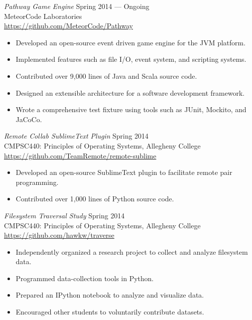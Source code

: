 \documentclass[margin]{res}
\begin{document}
\begin{resume}
        {\sl Pathway Game Engine} \hfill Spring 2014 --- Ongoing \\
                MeteorCode Laboratories \\ 
        \url{https://github.com/MeteorCode/Pathway}
        \begin{itemize} \itemsep -2pt %
        \item Developed an open-source event driven game engine for the JVM platform.
        \item Implemented features such as file I/O, event system, and scripting systems.
        \item Contributed over 9,000 lines of Java and Scala source code.
        \item Designed an extensible architecture for a software development framework.
        \item Wrote a comprehensive test fixture using tools such as JUnit, Mockito, and JaCoCo.
        \end{itemize}
        
        {\sl Remote Collab SublimeText Plugin } \hfill Spring 2014 \\
        CMPSC440: Principles of Operating Systems, Allegheny College \\
        \url{https://github.com/TeamRemote/remote-sublime}
        \begin{itemize}  \itemsep -2pt %
            \item Developed an open-source SublimeText plugin to facilitate remote pair programming.
            \item Contributed over 1,000 lines of Python source code.
        \end{itemize}
        
                {\sl Filesystem Traversal Study} \hfill Spring 2014 \\ 
                CMPSC440: Principles of Operating Systems, Allegheny College \\
                \url{https://github.com/hawkw/traverse}
                 \begin{itemize} \itemsep -2pt %
                    \item Independently organized a research project to collect and analyze filesystem data.
                    \item Programmed data-collection tools in Python.
                    \item Prepared an IPython notebook to analyze and visualize data.
                    \item Encouraged other students to voluntarily contribute datasets.
                \end{itemize}


\end{resume}
\end{document}
